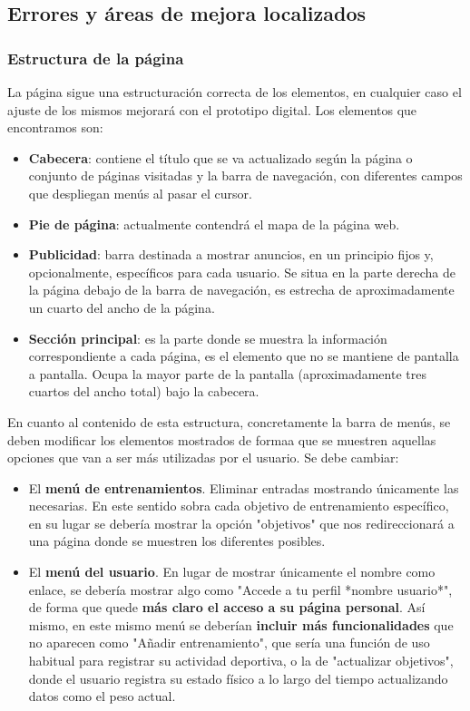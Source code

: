 \documentclass[a4paper]{article}
\begin{document}
\subsection{Errores y áreas de mejora localizados}

\subsubsection*{Estructura de la página}

La página sigue una estructuración correcta de los elementos, en cualquier caso el ajuste de los mismos mejorará con el prototipo digital. Los elementos que encontramos son:

	\begin{itemize}
		\item	\textbf{Cabecera}: contiene el título que se va actualizado según la página o conjunto de páginas visitadas y la barra de navegación, con diferentes campos que despliegan menús al pasar el cursor.
		\item	\textbf{Pie de página}: actualmente contendrá el mapa de la página web.
		\item	\textbf{Publicidad}: barra destinada a mostrar anuncios, en un principio fijos y, opcionalmente, específicos para cada usuario. Se situa en la parte derecha de la página debajo de la barra de navegación, es estrecha de aproximadamente un cuarto del ancho de la página.
		\item	\textbf{Sección principal}: es la parte donde se muestra la información correspondiente a cada página, es el elemento que no se mantiene de pantalla a pantalla. Ocupa la mayor parte de la pantalla (aproximadamente tres cuartos del ancho total) bajo la cabecera.
	\end{itemize}

En cuanto al contenido de esta estructura, concretamente la barra de menús, se deben modificar los elementos mostrados de formaa que se muestren aquellas opciones que van a ser más utilizadas por el usuario. Se debe cambiar:

	\begin{itemize}
		\item	El \textbf{menú de entrenamientos}. Eliminar entradas mostrando únicamente las necesarias. En este sentido sobra cada objetivo de entrenamiento específico, en su lugar se debería mostrar la opción "objetivos" que nos redireccionará a una página donde se muestren los diferentes posibles.
		\item	El\textbf{ menú del usuario}. En lugar de mostrar únicamente el nombre como enlace, se debería mostrar algo como "Accede a tu perfil *nombre usuario*", de forma que quede \textbf{más claro el acceso a su página personal}. Así mismo, en este mismo menú se deberían \textbf{incluir más funcionalidades} que no aparecen como "Añadir entrenamiento", que sería una función de uso habitual para registrar su actividad deportiva, o la de "actualizar objetivos", donde el usuario registra su estado físico a lo largo del tiempo actualizando datos como el peso actual.
	\end{itemize}
	
\end{document}
